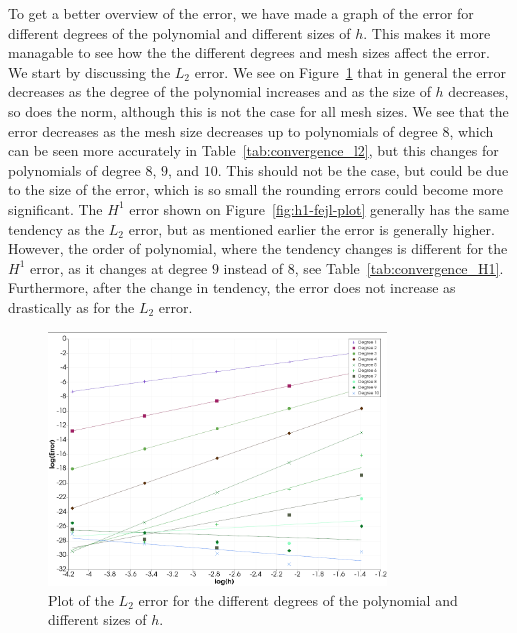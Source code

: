 To get a better overview of the error, 
we have made a graph of the error for different degrees of the polynomial 
and different sizes of $h$.
This makes it more managable to see how the the different degrees and mesh 
sizes affect the error. We start by discussing the $L_2$ error.
We see on Figure~\ref{fig:l2-fejl-plot} that in general the error 
decreases as the degree of the polynomial increases and as the size of 
$h$ decreases, so does the norm, 
although this is not the case for all mesh sizes.
We see that the error decreases as the mesh size decreases up 
to polynomials of degree $8$, 
which can be seen more accurately in Table~\ref{tab:convergence_l2}, 
but this changes for polynomials of degree $8$, $9$, and $10$.
This should not be the case, 
but could be due to the size of the error, which is so small the 
rounding errors could become more significant.
The $H^1$ error shown on Figure~\ref{fig:h1-fejl-plot} generally 
has the same tendency as the $L_2$ error, 
but as mentioned earlier the error is generally higher.
However, the order of polynomial, where the tendency changes is 
different for the $H^1$ error, as it changes at degree $9$ instead of $8$, 
see Table~\ref{tab:convergence_H1}.
Furthermore, after the change in tendency, 
the error does not increase as drastically as for the $L_2$ error. 

\begin{figure}
    \begin{centering}
    \includegraphics[width=0.8\textwidth]{Afsnit/Application/figurer/l2-fejl-plot.jpeg}
    \caption{Plot of the $L_2$ error for the different degrees of the polynomial and different sizes of $h$.}
    \label{fig:l2-fejl-plot}
    \end{centering}
\end{figure}

